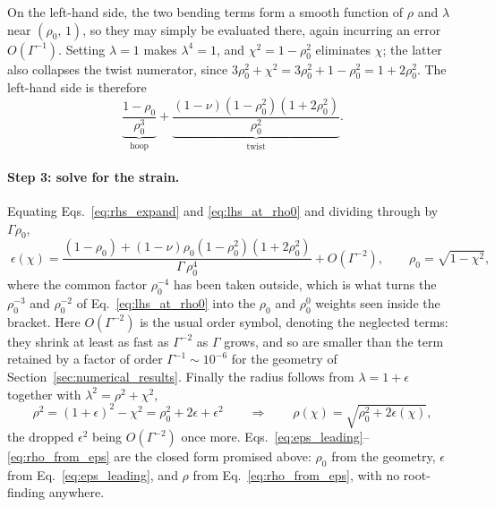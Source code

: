 \documentclass[11pt]{article}
\begin{document}
On the left-hand side, the two bending terms form a smooth function of $\rho$ and
$\lambda$ near $\left(\rho_0,\,1\right)$, so they may simply be evaluated there,
again incurring an error $O(\Gamma^{-1})$. Setting $\lambda = 1$ makes
$\lambda^{4} = 1$, and $\chi^{2} = 1-\rho_0^{2}$ eliminates $\chi$; the latter
also collapses the twist numerator, since
$3\rho_0^{2} + \chi^{2} = 3\rho_0^{2} + 1 - \rho_0^{2} = 1 + 2\rho_0^{2}$. The
left-hand side is therefore
\begin{equation}\label{eq:lhs_at_rho0}
    \underbrace{\frac{1-\rho_0}{\rho_0^{3}}}_{\text{hoop}}
    + \underbrace{\frac{\left(1-\nu\right)\left(1-\rho_0^{2}\right)
        \left(1+2\rho_0^{2}\right)}{\rho_0^{2}}}_{\text{twist}} .
\end{equation}

\paragraph{Step 3: solve for the strain.} Equating
Eqs.~\eqref{eq:rhs_expand} and \eqref{eq:lhs_at_rho0} and dividing through by
$\Gamma\rho_0$,
\begin{equation}\label{eq:eps_leading}
    \boxed{\;\epsilon(\chi)
      = \frac{\left(1-\rho_0\right)
        + \left(1-\nu\right)\rho_0\left(1-\rho_0^{2}\right)
          \left(1+2\rho_0^{2}\right)}{\Gamma\,\rho_0^{4}}
      + O\!\left(\Gamma^{-2}\right),
    \qquad \rho_0 = \sqrt{1-\chi^{2}},\;}
\end{equation}
where the common factor $\rho_0^{-4}$ has been taken outside, which is what turns
the $\rho_0^{-3}$ and $\rho_0^{-2}$ of Eq.~\eqref{eq:lhs_at_rho0} into the
$\rho_0$ and $\rho_0^{0}$ weights seen inside the bracket. Here
$O\!\left(\Gamma^{-2}\right)$ is the usual order symbol, denoting the neglected
terms: they shrink at least as fast as $\Gamma^{-2}$ as $\Gamma$ grows, and so are
smaller than the term retained by a factor of order $\Gamma^{-1} \sim 10^{-6}$ for
the geometry of Section~\ref{sec:numerical_results}. Finally the radius follows
from $\lambda = 1+\epsilon$ together with $\lambda^{2} = \rho^{2}+\chi^{2}$,
\begin{equation}\label{eq:rho_from_eps}
    \rho^{2} = \left(1+\epsilon\right)^{2} - \chi^{2}
      = \rho_0^{2} + 2\epsilon + \epsilon^{2}
    \qquad\Longrightarrow\qquad
    \rho(\chi) = \sqrt{\rho_0^{2} + 2\epsilon(\chi)},
\end{equation}
the dropped $\epsilon^{2}$ being $O(\Gamma^{-2})$ once more.
Eqs.~\eqref{eq:eps_leading}--\eqref{eq:rho_from_eps} are the closed form promised
above: $\rho_0$ from the geometry, $\epsilon$ from
Eq.~\eqref{eq:eps_leading}, and $\rho$ from Eq.~\eqref{eq:rho_from_eps}, with no
root-finding anywhere.
\end{document}

